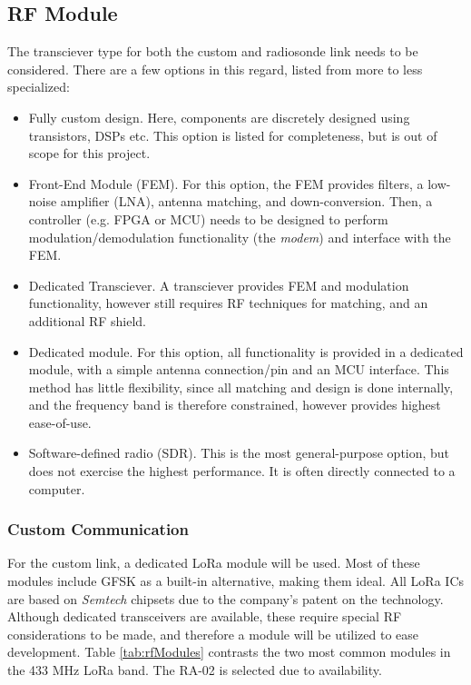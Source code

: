 \subsection{RF Module}
The transciever type for both the custom and radiosonde link needs to be considered. There are a few options in this regard, listed from more to less specialized:
\begin{itemize}
    \item Fully custom design. Here, components are discretely designed using transistors, DSPs etc. This option is listed for completeness, but is out of scope for this project.
    \item Front-End Module (FEM). For this option, the FEM provides filters, a low-noise amplifier (LNA), antenna matching, and down-conversion. Then, a controller (e.g. FPGA or MCU) needs to be designed to perform modulation/demodulation functionality (the \textit{modem}) and interface with the FEM.
    \item Dedicated Transciever. A transciever provides FEM and modulation functionality, however still requires RF techniques for matching, and an additional RF shield.
    \item Dedicated module. For this option, all functionality is provided in a dedicated module, with a simple antenna connection/pin and an MCU interface. This method has little flexibility, since all matching and design is done internally, and the frequency band is therefore constrained, however provides highest ease-of-use.
    \item Software-defined radio (SDR). This is the most general-purpose option, but does not exercise the highest performance. It is often directly connected to a computer.
\end{itemize}

\subsubsection{Custom Communication}
For the custom link, a dedicated LoRa module will be used. Most of these modules include GFSK as a built-in alternative, making them ideal. All LoRa ICs are based on \textit{Semtech} chipsets due to the company's patent on the technology. Although dedicated transceivers are available, these require special RF considerations to be made, and therefore a module will be utilized to ease development. Table \ref{tab:rfModules} contrasts the two most common modules in the 433 MHz LoRa band. The RA-02 is selected due to availability.

